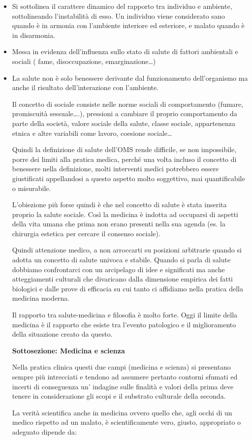 \documentclass[]{article}
\begin{document}
\begin{itemize}
\item
  Si sottolinea il carattere dinamico del rapporto tra individuo e
  ambiente, sottolineando l'instabilità di esso. Un individuo viene
  considerato sano quando è in armonia con l'ambiente interiore ed
  esteriore, e malato quando è in disarmonia.
\item
  Messa in evidenza dell'influenza sullo stato di salute di fattori
  ambientali e sociali ( fame, disoccupazione, emarginazione\ldots{})
\item
  La salute non è solo benessere derivante dal funzionamento
  dell'organismo ma anche il risultato dell'interazione con l'ambiente.

  Il concetto di sociale consiste nelle norme sociali di comportamento
  (fumare, promiscuità sessuale\ldots{}.), pressioni a cambiare il
  proprio comportamento da parte della società, valore sociale della
  salute, classe sociale, appartenenza etnica e altre variabili come
  lavoro, coesione sociale\ldots{}

  Quindi la definizione di salute dell'OMS rende difficile, se non
  impossibile, porre dei limiti alla pratica medica, perché una volta
  incluso il concetto di benessere nella definizione, molti interventi
  medici potrebbero essere giustificati appellandosi a questo aspetto
  molto soggettivo, mai quantificabile o misurabile.

  L'obiezione più forse quindi è che nel concetto di salute è stata
  inserita proprio la salute sociale. Così la medicina è indotta ad
  occuparsi di aspetti della vita umana che prima non erano presenti
  nella sua agenda (es. la chirurgia estetica per cercare il consenso
  sociale).

  Quindi attenzione medico, a non arroccarti su posizioni arbitrarie
  quando si adotta un concetto di salute univoca e stabile. Quando si
  parla di salute dobbiamo confrontarci con un arcipelago di idee e
  significati ma anche atteggiamenti culturali che divaricano dalla
  dimensione empirica dei fatti biologici e dalle prove di efficacia su
  cui tanto ci affidiamo nella pratica della medicina moderna.

  Il rapporto tra salute-medicina e filosofia è molto forte. Oggi il
  limite della medicina è il rapporto che esiste tra l'evento patologico
  e il miglioramento della situazione creato da questo.

  \textbf{Sottosezione: Medicina e scienza}

  Nella pratica clinica questi due campi (medicina e scienza) si
  presentano sempre più intrecciati e tendono ad assumere pertanto
  contorni sfumati ed incerti di conseguenza un' indagine sulle finalità
  e valori della prima deve tenere in considerazione gli scopi e il
  substrato culturale della seconda.

  La verità scientifica anche in medicina ovvero quello che, agli occhi
  di un medico rispetto ad un malato, è scientificamente vero, giusto,
  appropriato o adeguato dipende da:
\end{itemize}
\end{document}
